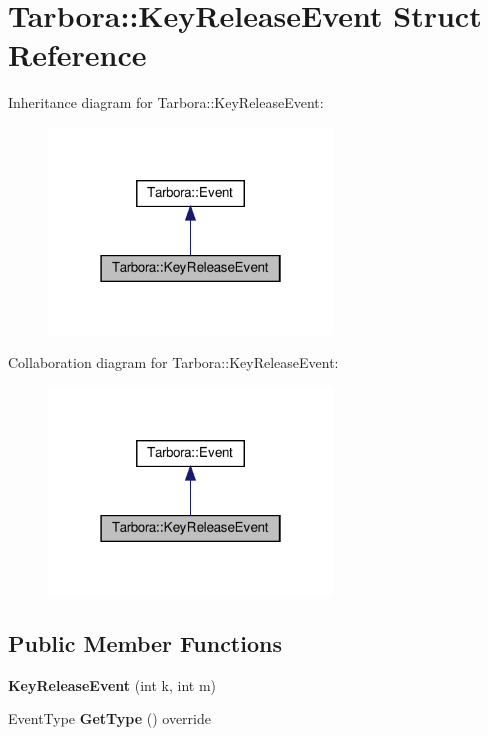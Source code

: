 \hypertarget{structTarbora_1_1KeyReleaseEvent}{}\section{Tarbora\+:\+:Key\+Release\+Event Struct Reference}
\label{structTarbora_1_1KeyReleaseEvent}


Inheritance diagram for Tarbora\+:\+:Key\+Release\+Event\+:\nopagebreak
\begin{figure}[H]
\begin{center}
\leavevmode
\includegraphics[width=214pt]{structTarbora_1_1KeyReleaseEvent__inherit__graph}
\end{center}
\end{figure}


Collaboration diagram for Tarbora\+:\+:Key\+Release\+Event\+:\nopagebreak
\begin{figure}[H]
\begin{center}
\leavevmode
\includegraphics[width=214pt]{structTarbora_1_1KeyReleaseEvent__coll__graph}
\end{center}
\end{figure}
\subsection*{Public Member Functions}
\begin{DoxyCompactItemize}
\item 
\mbox{\label{structTarbora_1_1KeyReleaseEvent_a6d49ddbadb39c4dc746a2c1643304fad}} 
{\bfseries Key\+Release\+Event} (int k, int m)
\item 
\mbox{\label{structTarbora_1_1KeyReleaseEvent_a4363578608888cab57f32ef45c07cef0}} 
Event\+Type {\bfseries Get\+Type} () override
\end{DoxyCompactItemize}
